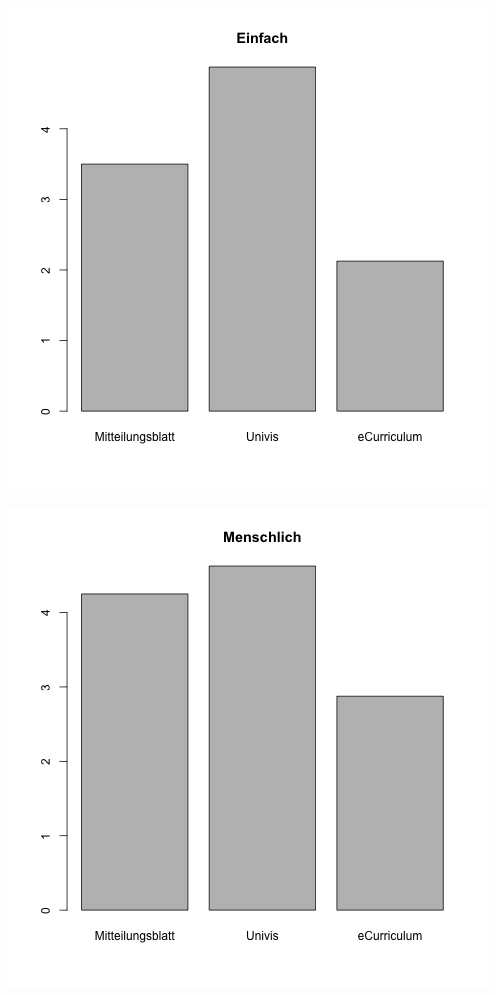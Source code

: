 \documentclass[a4paper,10pt]{scrartcl}
\begin{document}
\begin{center}
 \includegraphics[width=\linewidth]{./Appendix/Plots/Barplots/barplot1.png}
\end{center}
\begin{center}
 \includegraphics[width=\linewidth]{./Appendix/Plots/Barplots/barplot2.png}
\end{center}
\end{document}
